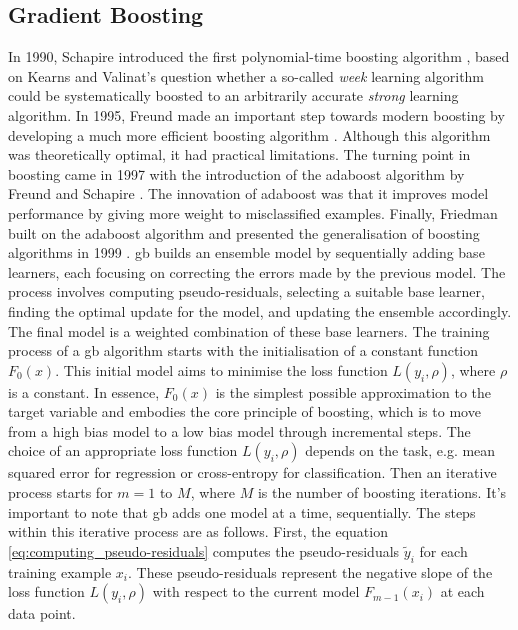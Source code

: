 \subsection{Gradient Boosting}
\label{sub:GB}

In 1990, Schapire introduced the first polynomial-time boosting algorithm \citep{schapire1990strength}, based on Kearns and Valinat's question \citep{kearns1988learning} whether a so-called \textit{week} learning algorithm could be systematically boosted to an arbitrarily accurate \textit{strong} learning algorithm. In 1995, Freund made an important step towards modern boosting by developing a much more efficient boosting algorithm \citep{freund1995boosting}. Although this algorithm was theoretically optimal, it had practical limitations. The turning point in boosting came in 1997 with the introduction of the \gls{adaboost} algorithm by Freund and Schapire \citep{freund1997decision}. The innovation of \gls{adaboost} was that it improves model performance by giving more weight to misclassified examples. Finally, Friedman built on the \gls{adaboost} algorithm and presented the generalisation of boosting algorithms in 1999 \citep{friedman2001greedy}.
\newline
\newline
\gls{gb} builds an ensemble model by sequentially adding base learners, each focusing on correcting the errors made by the previous model. The process involves computing pseudo-residuals, selecting a suitable base learner, finding the optimal update for the model, and updating the ensemble accordingly. The final model is a weighted combination of these base learners.
\newline
\newline
The training process of a \gls{gb} algorithm starts with the initialisation of a constant function $F_0(x)$. This initial model aims to minimise the loss function $L(y_i, \rho)$, where $\rho$ is a constant. In essence, $F_0(x)$ is the simplest possible approximation to the target variable and embodies the core principle of boosting, which is to move from a high bias model to a low bias model through incremental steps. The choice of an appropriate loss function $L(y_i, \rho)$ depends on the task, e.g. mean squared error for regression or cross-entropy for classification.
\newline
\newline
Then an iterative process starts for $m = 1$ to $M$, where $M$ is the number of boosting iterations. It's important to note that \gls{gb} adds one model at a time, sequentially. The steps within this iterative process are as follows.
\newline
\newline
First, the equation \ref{eq:computing_pseudo-residuals} computes the pseudo-residuals $\tilde{y}_i$ for each training example $x_i$. These pseudo-residuals represent the negative slope of the loss function $L(y_i, \rho)$ with respect to the current model $F_{m-1}(x_i)$ at each data point.

